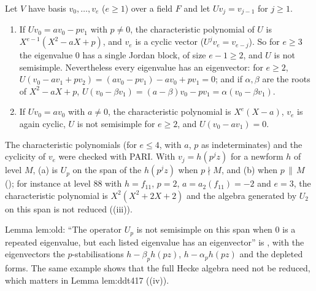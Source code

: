 \begin{example}\label{ex:modules:shift}
Let $V$ have basis $v_0,\dots,v_e$ ($e\ge1$) over a field $F$ and let $Uv_j=v_{j-1}$ for $j\ge1$.
\begin{enumerate}[label=(\alph*)]
\item If $Uv_0=av_0-pv_1$ with $p\ne0$, the characteristic polynomial of $U$ is $X^{e-1}(X^2-aX+p)$, and $v_e$ is a cyclic vector ($U^jv_e=v_{e-j}$). So for $e\ge3$ the
eigenvalue $0$ has a single Jordan block, of size $e-1\ge2$, and $U$ is not semisimple. Nevertheless every eigenvalue has an eigenvector: for $e\ge2$,
$U(v_0-av_1+pv_2)=(av_0-pv_1)-av_0+pv_1=0$; and if $\alpha,\beta$ are the roots of $X^2-aX+p$, $U(v_0-\beta v_1)=(a-\beta)v_0-pv_1=\alpha(v_0-\beta v_1)$.
\item If $Uv_0=av_0$ with $a\ne0$, the characteristic polynomial is $X^e(X-a)$, $v_e$ is again cyclic, $U$ is not semisimple for $e\ge2$, and $U(v_0-av_1)=0$.
\end{enumerate}
The characteristic polynomials (for $e\le4$, with $a$, $p$ as indeterminates) and the cyclicity of $v_e$ were checked with PARI. With $v_j=h(p^jz)$ for a newform $h$
of level $M$, (a) is $U_p$ on the span of the $h(p^jz)$ when $p\nmid M$, and (b) when $p\,\|\,M$ (); for instance at level $88$ with $h=f_{11}$, $p=2$,
$a=a_2(f_{11})=-2$ and $e=3$, the characteristic polynomial is $X^2(X^2+2X+2)$ and the algebra generated by $U_2$ on this span is not reduced
((iii)).
\end{example}

\begin{paperlink}\label{pl:modules:old}
Lemma lem:old: ``The operator $U_p$ is not semisimple on this span when $0$ is a repeated eigenvalue, but each listed eigenvalue has an eigenvector'' is
, with the eigenvectors the $p$-stabilisations $h-\beta_ph(pz)$, $h-\alpha_ph(pz)$ and the depleted forms. The same example shows
that the full Hecke algebra need not be reduced, which matters in Lemma lem:ddt417 ((iv)).
\end{paperlink}

